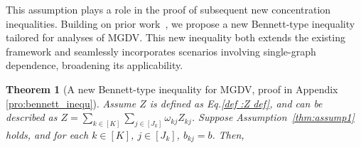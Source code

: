 \documentclass{article}
\def\eE{\mathbb{E}}
\def\defeq{\overset{\textup{def}}{=}}
\newtheorem{theorem}{Theorem}
\begin{document}
This assumption plays a role in the proof of subsequent new concentration inequalities. 
Building on prior work~\cite{ralaivola2015entropy}, we propose a new Bennett-type inequality tailored for analyses of MGDV. This new inequality both extends the existing framework and seamlessly incorporates scenarios involving single-graph dependence, broadening its applicability.
    \begin{theorem}[A new Bennett-type inequality for MGDV, proof in Appendix \ref{pro:bennett_inequ}]
    \label{thm:bennett_inequality} 
    Assume $Z$ is defined as Eq.\eqref{def :Z def}, and can be described as $Z = \sum_{k \in [K]} \sum_{j \in [J_k]} \omega_{kj} Z_{kj}$.  
    Suppose Assumption~\ref{thm:assump1} holds, and for each $k \in [K]$, $j \in [J_k]$, $b_{kj} = b$. Then, 

\end{theorem}
\end{document}
